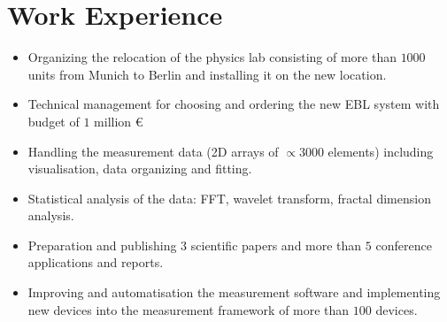 \documentclass[a4paper,10pt]{article}
\begin{document}

\section*{Work Experience}
\begin{flushleft}{\textbf{PhD Researcher|Project Manager}, \textbf{Paul-Drude-Institut, Berlin, }\end{flushleft}
\begin{itemize}
\item Organizing the relocation of the physics lab consisting of more than $1000$ units from Munich to Berlin and installing it on the new location.
\item Technical management for choosing and ordering the new EBL system with budget of $1$ million €\
\item Handling the measurement data (2D arrays of $\propto3000$ elements) including visualisation, data organizing and fitting.
\item Statistical analysis of the data: FFT, wavelet transform, fractal dimension analysis. 
\item Preparation and publishing $3$ scientific papers and more than $5$ conference applications and reports.
\item Improving and automatisation the measurement software and implementing new devices into the measurement framework of more than $100$ devices.
\end{itemize}
\end{document}
